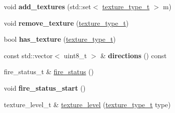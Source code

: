 \begin{DoxyCompactItemize}
void {\bfseries add\+\_\+textures} (std\+::set$<$ \hyperlink{structroom__data_a9552b46091ee649079e41f04f9543b8e}{texture\+\_\+type\+\_\+t} $>$ m)
\item 
\mbox{\label{structroom__data_a22d4cba8d92d179a8de23232cb1c6cfc}} 
void {\bfseries remove\+\_\+texture} (\hyperlink{structroom__data_a9552b46091ee649079e41f04f9543b8e}{texture\+\_\+type\+\_\+t})
\item 
\mbox{\label{structroom__data_a3d3d3ce872f4157dc238f44131d33b5a}} 
bool {\bfseries has\+\_\+texture} (\hyperlink{structroom__data_a9552b46091ee649079e41f04f9543b8e}{texture\+\_\+type\+\_\+t})
\item 
\mbox{\label{structroom__data_a5b0f4da4c7c51f80c704c686045ed331}} 
const std\+::vector$<$ uint8\+\_\+t $>$ \& {\bfseries directions} () const
\item 
fire\+\_\+status\+\_\+t \& \hyperlink{structroom__data_a94b548a90fd4952075ab44b2622432a7}{fire\+\_\+status} ()
\item 
\mbox{\label{structroom__data_ae276d39f5763333989a885be8c1d748b}} 
void {\bfseries fire\+\_\+status\+\_\+start} ()
\item 
texture\+\_\+level\+\_\+t \& \hyperlink{structroom__data_aae0acfa6fdd06020915943202f3826c2}{texture\+\_\+level} (\hyperlink{structroom__data_a9552b46091ee649079e41f04f9543b8e}{texture\+\_\+type\+\_\+t} type)
\end{DoxyCompactItemize}
